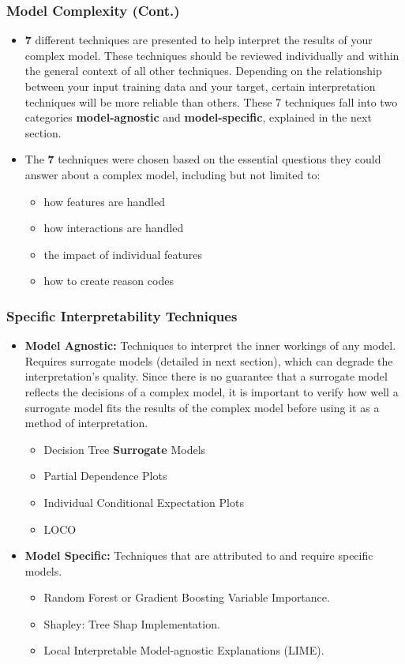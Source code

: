 \begin{frame}\frametitle{Model Complexity (Cont.)}	
	\begin{itemize}
		\item \textbf{7} different techniques are presented to help interpret the results of your complex model. These techniques should be reviewed individually and within the general context of all other techniques. Depending on the relationship between your input training data and your target, certain interpretation techniques will be more reliable than others. These 7 techniques fall into two categories \textbf{model-agnostic} and \textbf{model-specific}, explained in the next section.
		\bigskip
		\item The \textbf{7} techniques were chosen based on the essential questions they could answer about a complex model, including but not limited to:
		\begin{itemize}
			\item how features are handled
			\item how interactions are handled
			\item the impact of individual features
			\item how to create reason codes
		\end{itemize}
	\end{itemize}
\end{frame}



\begin{frame}\frametitle{Specific Interpretability Techniques}

	\begin{itemize}
		\item \textbf{Model Agnostic:} Techniques to interpret the inner workings of any model. Requires surrogate models (detailed in next section), which can degrade the interpretation's quality. Since there is no guarantee that a surrogate model reflects the decisions of a complex model, it is important to verify how well a surrogate model fits the results of the complex model before using it as a method of interpretation.
		\begin{itemize} 
			\item Decision Tree \textbf{Surrogate} Models
			\item Partial Dependence Plots
			\item Individual Conditional Expectation Plots
			\item LOCO
		\end{itemize} 
		\bigskip
		\item \textbf{Model Specific:} Techniques that are attributed to and require specific models.
		\begin{itemize}
			\item Random Forest or Gradient Boosting Variable Importance.
			\item Shapley: Tree Shap Implementation.
			\item Local Interpretable Model-agnostic Explanations (LIME).
		\end{itemize} 
	\end{itemize}
\end{frame}
